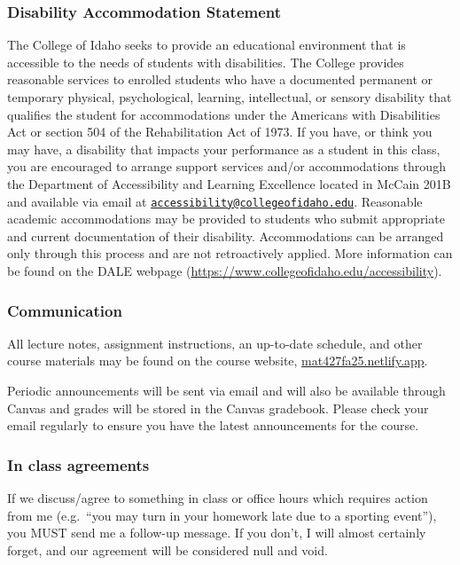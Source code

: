 \documentclass[
  letterpaper,
  DIV=11,
  numbers=noendperiod]{scrartcl}
\begin{document}
\subsubsection{Disability Accommodation
Statement}\label{disability-accommodation-statement}

The College of Idaho seeks to provide an educational environment that is
accessible to the needs of students with disabilities. The College
provides reasonable services to enrolled students who have a documented
permanent or temporary physical, psychological, learning, intellectual,
or sensory disability that qualifies the student for accommodations
under the Americans with Disabilities Act or section 504 of the
Rehabilitation Act of 1973. If you have, or think you may have, a
disability that impacts your performance as a student in this class, you
are encouraged to arrange support services and/or accommodations through
the Department of Accessibility and Learning Excellence located in
McCain 201B and available via email at
\href{mailto:accessibility@collegeofidaho.edu}{\nolinkurl{accessibility@collegeofidaho.edu}}.
Reasonable academic accommodations may be provided to students who
submit appropriate and current documentation of their disability.
Accommodations can be arranged only through this process and are not
retroactively applied. More information can be found on the DALE webpage
(\url{https://www.collegeofidaho.edu/accessibility}).

\subsubsection{Communication}\label{communication}

All lecture notes, assignment instructions, an up-to-date schedule, and
other course materials may be found on the course website,
\href{https://mat427sp25.netlify.app}{mat427fa25.netlify.app}.

Periodic announcements will be sent via email and will also be available
through Canvas and grades will be stored in the Canvas gradebook. Please
check your email regularly to ensure you have the latest announcements
for the course.

\subsubsection{In class agreements}\label{in-class-agreements}

If we discuss/agree to something in class or office hours which requires
action from me (e.g.~``you may turn in your homework late due to a
sporting event''), you MUST send me a follow-up message. If you don't, I
will almost certainly forget, and our agreement will be considered null
and void.
\end{document}
